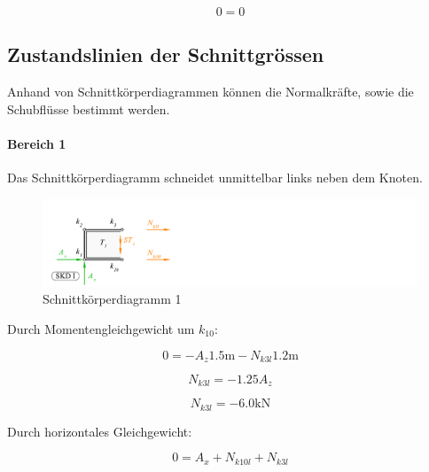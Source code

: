 \documentclass[
  12pt,
  letterpaper,
  DIV=11,
  egregdoesnotlikesansseriftitles]{scrartcl}
\let\oldparagraph\paragraph
\renewcommand{\paragraph}[1]{\oldparagraph{#1}\mbox{}}
\begin{document}
\begin{equation}0 = 0\end{equation}

\hypertarget{zustandslinien-der-schnittgruxf6ssen}{%
\subsection{Zustandslinien der
Schnittgrössen}\label{zustandslinien-der-schnittgruxf6ssen}}

Anhand von Schnittkörperdiagrammen können die Normalkräfte, sowie die
Schubflüsse bestimmt werden.

\hypertarget{bereich-1}{%
\paragraph{Bereich 1}\label{bereich-1}}

Das Schnittkörperdiagramm schneidet unmittelbar links neben dem Knoten.

\begin{figure}[H]

{\centering \includegraphics{BSI_HS23_Testat_03_files/mediabag/../images/Testat_03_HS23_SKD4.pdf}

}

\caption{\label{fig-skd1}Schnittkörperdiagramm 1}

\end{figure}

Durch Momentengleichgewicht um \(k_{10}\):

\begin{equation}0 = - A_{z} 1.5 \text{m} - N_{k3l} 1.2 \text{m}\end{equation}

\begin{equation}N_{k3l} = - 1.25 A_{z}\end{equation}

\begin{equation}N_{k3l} = - 6.0 \text{k} \text{N}\end{equation}

Durch horizontales Gleichgewicht:

\begin{equation}0 = A_{x} + N_{k10l} + N_{k3l}\end{equation}
\end{document}
